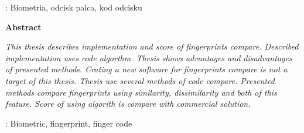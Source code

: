 \begin{titlepage}
    : Biometria, odcisk palca, kod odcisku
    \par
    \vspace{4\baselineskip}
    \begin{center}
	{\large\bfseries Abstract}\par\bigskip
    \end{center}
    \vspace*{1\baselineskip}
    {
\itshape This thesis describes implementation and score of fingerprints compare. Described implementation uses code algorthm. Thesis shows advantages and disadvantages of presented methods. Crating a new software for fingerprints compare is not a target of this thesis. Thesis use several methods of code compare. Presented methods compare fingerprints using similarity, dissimilarity and both of this feature. Score of using algorith is compare with commercial solution.}
    \vspace*{1\baselineskip}

    : Biometric, fingerprint, finger code

\end{titlepage}

